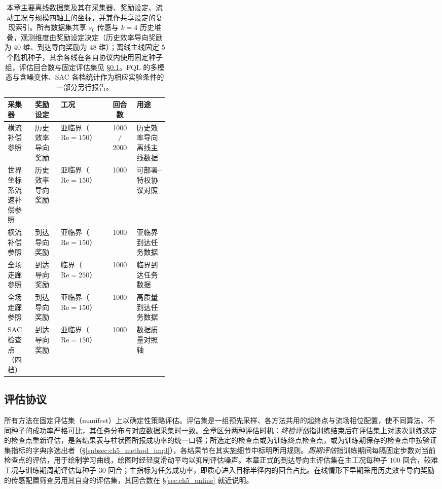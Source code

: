 \begin{table}[t]
\centering
\caption{本章主要离线数据集及其在采集器、奖励设定、流动工况与规模四轴上的坐标，并兼作共享设定的复现索引。所有数据集共享 $s_0$ 传感与 $k=4$ 历史堆叠，观测维度由奖励设定决定（历史效率导向奖励为 $40$ 维、到达导向奖励为 $48$ 维）；离线主线固定 $5$ 个随机种子，其余各线在各自协议内使用固定种子组，评估回合数与固定评估集见 \S\ref{subsec:ch5_eval}。FQL 的多模态与含噪变体、SAC 各档统计作为相应实验条件的一部分另行报告。}
\label{tab:ch5_datasets}
\begin{tabular}{>{\raggedright\arraybackslash}p{0.17\linewidth} l l c >{\raggedright\arraybackslash}p{0.20\linewidth}}
\toprule
\textbf{采集器} & \textbf{奖励设定} & \textbf{工况} & \textbf{回合数} & \textbf{用途} \\
\midrule
横流补偿参照 & 历史效率导向奖励 & 亚临界（$\mathrm{Re}{=}150$） & 1000 / 2000 & 历史效率导向离线主线数据 \\
世界坐标系流速补偿参照 & 历史效率导向奖励 & 亚临界（$\mathrm{Re}{=}150$） & 1000 & 可部署–特权协议对照 \\
横流补偿参照 & 到达导向奖励 & 亚临界（$\mathrm{Re}{=}150$） & 1000 & 亚临界到达任务数据 \\
全场走廊参照 & 到达导向奖励 & 临界（$\mathrm{Re}{=}250$） & 1000 & 临界到达任务数据 \\
全场走廊参照 & 到达导向奖励 & 亚临界（$\mathrm{Re}{=}150$） & 1000 & 高质量到达任务数据 \\
SAC 检查点（四档） & 到达导向奖励 & 亚临界（$\mathrm{Re}{=}150$） & 1000 & 数据质量对照轴 \\
\bottomrule
\end{tabular}
\end{table}

\subsection{评估协议}\label{subsec:ch5_eval}

所有方法在固定评估集（manifest）上以确定性策略评估。评估集是一组预先采样、各方法共用的起终点与流场相位配置，使不同算法、不同种子的成功率严格可比，其任务分布与对应数据采集时一致。全章区分两种评估时机：\emph{终检评估}指训练结束后在评估集上对该次训练选定的检查点重新评估，是各结果表与柱状图所报成功率的统一口径；所选定的检查点或为训练终点检查点，或为训练期保存的检查点中按验证集指标的字典序选出者（\S\ref{subsec:ch5_method_impl}），各结果节在其实施细节中标明所用规则。\emph{周期评估}指训练期间每隔固定步数对当前检查点的评估，用于绘制学习曲线，绘图时经轻度滑动平均以抑制评估噪声。本章正式的到达导向主评估集在主工况每种子 $100$ 回合，较难工况与训练期周期评估每种子 $30$ 回合；主指标为任务成功率，即质心进入目标半径内的回合占比。在线情形下早期采用历史效率导向奖励的传感配置筛查另用其自身的评估集，其回合数在 \S\ref{sec:ch5_online} 就近说明。

